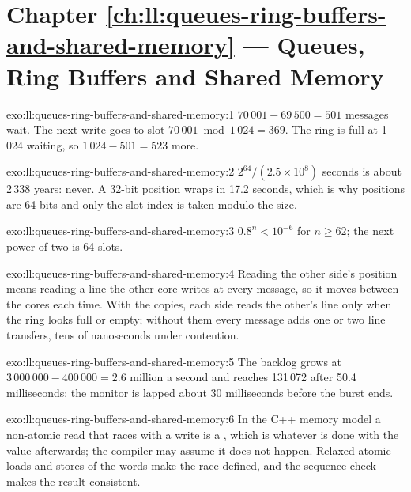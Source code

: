 \section*{Chapter \ref{ch:ll:queues-ring-buffers-and-shared-memory} --- Queues, Ring Buffers and Shared Memory}

\begin{solution}{exo:ll:queues-ring-buffers-and-shared-memory:1}
$70\,001 - 69\,500 = 501$ messages wait. The next write goes to slot $70\,001 \bmod 1\,024 = 369$. The ring is full at 1\,024 waiting,
so $1\,024 - 501 = 523$ more.
\end{solution}

\begin{solution}{exo:ll:queues-ring-buffers-and-shared-memory:2}
$2^{64}/(2.5 \times 10^8)$ seconds is about 2\,338 years: never. A 32-bit position wraps in 17.2 seconds, which is why positions are
64 bits and only the slot index is taken modulo the size.
\end{solution}

\begin{solution}{exo:ll:queues-ring-buffers-and-shared-memory:3}
$0.8^n < 10^{-6}$ for $n \ge 62$; the next power of two is 64 slots.
\end{solution}

\begin{solution}{exo:ll:queues-ring-buffers-and-shared-memory:4}
Reading the other side's position means reading a line the other core writes at every message, so it moves between the cores each
time. With the copies, each side reads the other's line only when the ring looks full or empty; without them every message adds one
or two line transfers, tens of nanoseconds under contention.
\end{solution}

\begin{solution}{exo:ll:queues-ring-buffers-and-shared-memory:5}
The backlog grows at $3\,000\,000 - 400\,000 = 2.6$ million a second and reaches 131\,072 after 50.4 milliseconds: the monitor is
lapped about 30 milliseconds before the burst ends.
\end{solution}

\begin{solution}{exo:ll:queues-ring-buffers-and-shared-memory:6}
In the C++ memory model a non-atomic read that races with a write is a , which is  whatever is done with
the value afterwards; the compiler may assume it does not happen. Relaxed atomic loads and stores of the words make the race defined,
and the sequence check makes the result consistent.
\end{solution}

